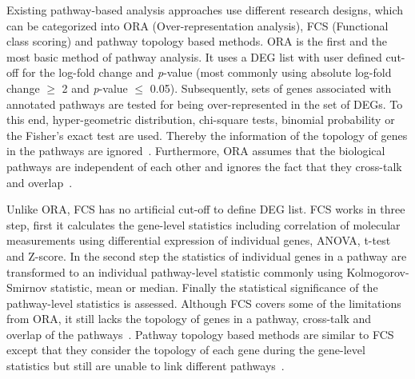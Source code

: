 \documentclass[twocolumn]{article}
\begin{document}
Existing pathway-based analysis approaches use different research
designs, which can be categorized into ORA (Over-representation
analysis), FCS (Functional class scoring) and pathway topology based
methods. ORA is the first and the most basic method of pathway
analysis. It uses a DEG list with user defined cut-off for the log-fold change and
\textit{p}-value (most commonly using absolute log-fold change
$\geq$ 2 and \textit{p}-value $\leq$ 0.05). Subsequently, sets of genes associated
with annotated pathways are tested for being over-represented in the
set of DEGs. To this end, hyper-geometric
distribution, chi-square tests, binomial probability or the Fisher’s
exact test are used. Thereby the information of the topology of genes in the
pathways are ignored~\cite{Bayer}. Furthermore, ORA assumes that the biological
pathways are independent of each other and ignores the fact that they cross-talk and overlap~\cite{Khatri2012,Campos}.

Unlike ORA, FCS has no artificial cut-off to define DEG list. FCS works in three
step, first it calculates the gene-level statistics including correlation of molecular measurements  using differential expression of individual genes, ANOVA, t-test and  Z-score. In the second step the statistics of individual genes in a pathway are transformed to an individual pathway-level statistic commonly using Kolmogorov-Smirnov statistic, mean or median. Finally the statistical significance of the pathway-level statistics is assessed. Although FCS covers some of the
limitations from ORA, it still lacks the topology of genes in a pathway, cross-talk and
overlap of the pathways~\cite{Khatri2012,Campos}. Pathway topology
based methods are similar to FCS except that they consider the
topology of each gene during the gene-level
statistics but still are unable to link different pathways~\cite{Khatri2012}.
\end{document}
